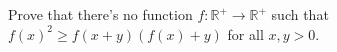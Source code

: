 Prove that there's no function $f: \mathbb{R}^+\rightarrow\mathbb{R}^+$ such that $f(x)^2\ge f(x+y)\left(f(x)+y\right)$ for all $x,y>0$.